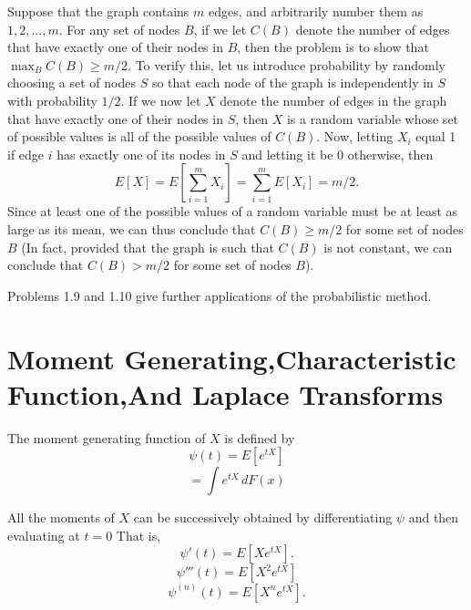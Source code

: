 \documentclass[lang=cn,10pt]{elegantbook}
\begin{document}
\begin{figure}[h]
	\centering
	\label{fig:graph}
\end{figure}

\begin{solution}
	Suppose that the graph contains \( m \) edges, and arbitrarily number them as \( 1, 2, \ldots, m \). For any set of nodes \( B \), if we let \( C(B) \) denote the number of edges that have exactly one of their nodes in \( B \), then the problem is to show that \( \max_{B} C(B) \geq m/2 \). To verify this, let us introduce probability by randomly choosing a set of nodes \( S \) so that each node of the graph is independently in \( S \) with probability \( 1/2 \). If we now let \( X \) denote the number of edges in the graph that have exactly one of their nodes in \( S \), then \( X \) is a random variable whose set of possible values is all of the possible values of \( C(B) \). Now, letting \( X_i \) equal 1 if edge \( i \) has exactly one of its nodes in \( S \) and letting it be 0 otherwise, then
	\[
	E[X] = E\left[\sum_{i=1}^{m} X_i\right] = \sum_{i=1}^{m} E[X_i] = m/2.
	\]
	Since at least one of the possible values of a random variable must be at least as large as its mean, we can thus conclude that \( C(B) \geq m/2 \) for some set of nodes \( B \) (In fact, provided that the graph is such that \( C(B) \) is not constant, we can conclude that \( C(B) > m/2 \) for some set of nodes \( B \)).
	
	Problems 1.9 and 1.10 give further applications of the probabilistic method.
\end{solution}
\section{Moment Generating,Characteristic Function,And Laplace Transforms}

The moment generating function of \(X\) is defined by
\[
\psi(t) = E[e^{tX}]
\]
\[
= \int e^{tX} \, dF(x)
\]

All the moments of \(X\) can be successively obtained by differentiating \(\psi\) and then evaluating at \(t = 0\) That is,
\[
\psi'(t) = E[X e^{tX}].
\]
\[
\psi'''(t) = E[X^2 e^{tX}]
\]
\[
\psi^{(n)}(t) = E[X^n e^{tX}].
\]
\end{document}
